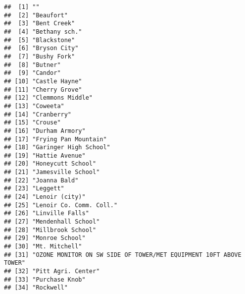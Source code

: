 \documentclass[]{article}
\begin{document}
\begin{verbatim}
##  [1] ""                                                                
##  [2] "Beaufort"                                                        
##  [3] "Bent Creek"                                                      
##  [4] "Bethany sch."                                                    
##  [5] "Blackstone"                                                      
##  [6] "Bryson City"                                                     
##  [7] "Bushy Fork"                                                      
##  [8] "Butner"                                                          
##  [9] "Candor"                                                          
## [10] "Castle Hayne"                                                    
## [11] "Cherry Grove"                                                    
## [12] "Clemmons Middle"                                                 
## [13] "Coweeta"                                                         
## [14] "Cranberry"                                                       
## [15] "Crouse"                                                          
## [16] "Durham Armory"                                                   
## [17] "Frying Pan Mountain"                                             
## [18] "Garinger High School"                                            
## [19] "Hattie Avenue"                                                   
## [20] "Honeycutt School"                                                
## [21] "Jamesville School"                                               
## [22] "Joanna Bald"                                                     
## [23] "Leggett"                                                         
## [24] "Lenoir (city)"                                                   
## [25] "Lenoir Co. Comm. Coll."                                          
## [26] "Linville Falls"                                                  
## [27] "Mendenhall School"                                               
## [28] "Millbrook School"                                                
## [29] "Monroe School"                                                   
## [30] "Mt. Mitchell"                                                    
## [31] "OZONE MONITOR ON SW SIDE OF TOWER/MET EQUIPMENT 10FT ABOVE TOWER"
## [32] "Pitt Agri. Center"                                               
## [33] "Purchase Knob"                                                   
## [34] "Rockwell"                                                        

\end{verbatim}
\end{document}
